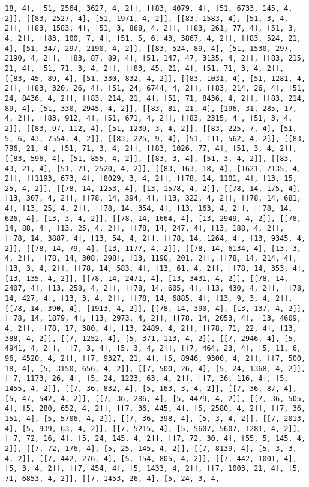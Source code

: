 \documentclass[12pt,fleqn]{article}\usepackage{../../common}
\begin{document}
\begin{verbatim}
18, 4], [51, 2564, 3627, 4, 2]], [[83, 4079, 4], [51, 6733, 145, 4, 2]], [[83, 2527, 4], [51, 1971, 4, 2]], [[83, 1583, 4], [51, 3, 4, 2]], [[83, 1583, 4], [51, 3, 868, 4, 2]], [[83, 261, 77, 4], [51, 3, 4, 2]], [[83, 100, 7, 4], [51, 5, 6, 43, 3867, 4, 2]], [[83, 524, 21, 4], [51, 347, 297, 2190, 4, 2]], [[83, 524, 89, 4], [51, 1530, 297, 2190, 4, 2]], [[83, 87, 89, 4], [51, 147, 47, 3135, 4, 2]], [[83, 215, 21, 4], [51, 71, 3, 4, 2]], [[83, 45, 21, 4], [51, 71, 3, 4, 2]], [[83, 45, 89, 4], [51, 330, 832, 4, 2]], [[83, 1031, 4], [51, 1281, 4, 2]], [[83, 320, 26, 4], [51, 24, 6744, 4, 2]], [[83, 214, 26, 4], [51, 24, 8436, 4, 2]], [[83, 214, 21, 4], [51, 71, 8436, 4, 2]], [[83, 214, 89, 4], [51, 330, 2945, 4, 2]], [[83, 81, 21, 4], [196, 31, 285, 17, 4, 2]], [[83, 912, 4], [51, 671, 4, 2]], [[83, 2315, 4], [51, 3, 4, 2]], [[83, 97, 112, 4], [51, 1239, 3, 4, 2]], [[83, 225, 7, 4], [51, 5, 6, 43, 7554, 4, 2]], [[83, 225, 9, 4], [51, 111, 562, 4, 2]], [[83, 796, 21, 4], [51, 71, 3, 4, 2]], [[83, 1026, 77, 4], [51, 3, 4, 2]], [[83, 596, 4], [51, 855, 4, 2]], [[83, 3, 4], [51, 3, 4, 2]], [[83, 43, 21, 4], [51, 71, 2520, 4, 2]], [[83, 163, 18, 4], [1621, 7135, 4, 2]], [[1193, 673, 4], [8029, 3, 4, 2]], [[78, 14, 1101, 4], [13, 15, 25, 4, 2]], [[78, 14, 1253, 4], [13, 1578, 4, 2]], [[78, 14, 175, 4], [13, 307, 4, 2]], [[78, 14, 394, 4], [13, 322, 4, 2]], [[78, 14, 681, 4], [13, 25, 4, 2]], [[78, 14, 354, 4], [13, 163, 4, 2]], [[78, 14, 626, 4], [13, 3, 4, 2]], [[78, 14, 1664, 4], [13, 2949, 4, 2]], [[78, 14, 88, 4], [13, 25, 4, 2]], [[78, 14, 247, 4], [13, 188, 4, 2]], [[78, 14, 3887, 4], [13, 54, 4, 2]], [[78, 14, 1264, 4], [13, 9345, 4, 2]], [[78, 14, 79, 4], [13, 1177, 4, 2]], [[78, 14, 6134, 4], [13, 3, 4, 2]], [[78, 14, 308, 298], [13, 1190, 201, 2]], [[78, 14, 214, 4], [13, 3, 4, 2]], [[78, 14, 583, 4], [13, 61, 4, 2]], [[78, 14, 353, 4], [13, 135, 4, 2]], [[78, 14, 2471, 4], [13, 3431, 4, 2]], [[78, 14, 2407, 4], [13, 258, 4, 2]], [[78, 14, 605, 4], [13, 430, 4, 2]], [[78, 14, 427, 4], [13, 3, 4, 2]], [[78, 14, 6885, 4], [13, 9, 3, 4, 2]], [[78, 14, 390, 4], [1913, 4, 2]], [[78, 14, 390, 4], [13, 137, 4, 2]], [[78, 14, 1879, 4], [13, 2973, 4, 2]], [[78, 14, 2053, 4], [13, 4609, 4, 2]], [[78, 17, 380, 4], [13, 2489, 4, 2]], [[78, 71, 22, 4], [13, 388, 4, 2]], [[7, 1252, 4], [5, 371, 113, 4, 2]], [[7, 2946, 4], [5, 4941, 4, 2]], [[7, 3, 4], [5, 3, 4, 2]], [[7, 464, 23, 4], [5, 11, 6, 96, 4520, 4, 2]], [[7, 9327, 21, 4], [5, 8946, 9300, 4, 2]], [[7, 500, 18, 4], [5, 3150, 656, 4, 2]], [[7, 500, 26, 4], [5, 24, 1368, 4, 2]], [[7, 1173, 26, 4], [5, 24, 1223, 63, 4, 2]], [[7, 36, 116, 4], [5, 1455, 4, 2]], [[7, 36, 832, 4], [5, 163, 3, 4, 2]], [[7, 36, 87, 4], [5, 47, 542, 4, 2]], [[7, 36, 286, 4], [5, 4479, 4, 2]], [[7, 36, 505, 4], [5, 280, 652, 4, 2]], [[7, 36, 445, 4], [5, 2580, 4, 2]], [[7, 36, 151, 4], [5, 5706, 4, 2]], [[7, 36, 398, 4], [5, 3, 4, 2]], [[7, 2013, 4], [5, 939, 63, 4, 2]], [[7, 5215, 4], [5, 5607, 5607, 1281, 4, 2]], [[7, 72, 16, 4], [5, 24, 145, 4, 2]], [[7, 72, 30, 4], [55, 5, 145, 4, 2]], [[7, 72, 176, 4], [5, 25, 145, 4, 2]], [[7, 8139, 4], [5, 3, 3, 4, 2]], [[7, 442, 276, 4], [5, 154, 805, 4, 2]], [[7, 442, 1001, 4], [5, 3, 4, 2]], [[7, 454, 4], [5, 1433, 4, 2]], [[7, 1003, 21, 4], [5, 71, 6853, 4, 2]], [[7, 1453, 26, 4], [5, 24, 3, 4, 
\end{verbatim}
\end{document}

